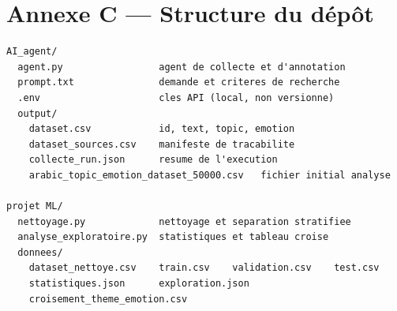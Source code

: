 \documentclass[11pt,a4paper]{article}
\begin{document}
\section*{Annexe C --- Structure du dépôt}
\begin{tcolorbox}[enhanced,colback=mist,colframe=mist,borderline west={3pt}{0pt}{navy},
  arc=2pt,left=10pt,top=5pt,bottom=5pt]
\begin{lstlisting}[style=cmd]
AI_agent/
  agent.py                 agent de collecte et d'annotation
  prompt.txt               demande et criteres de recherche
  .env                     cles API (local, non versionne)
  output/
    dataset.csv            id, text, topic, emotion
    dataset_sources.csv    manifeste de tracabilite
    collecte_run.json      resume de l'execution
    arabic_topic_emotion_dataset_50000.csv   fichier initial analyse

projet ML/
  nettoyage.py             nettoyage et separation stratifiee
  analyse_exploratoire.py  statistiques et tableau croise
  donnees/
    dataset_nettoye.csv    train.csv    validation.csv    test.csv
    statistiques.json      exploration.json
    croisement_theme_emotion.csv
\end{lstlisting}
\end{tcolorbox}
\end{document}
